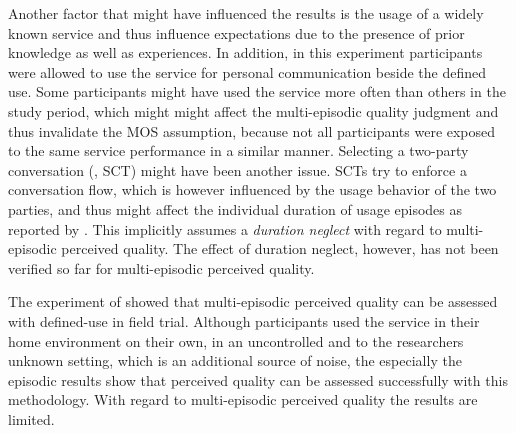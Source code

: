 Another factor that might have influenced the results is the usage of a widely known service and thus influence expectations due to the presence of prior knowledge as well as experiences.
In addition, in this experiment participants were allowed to use the service for personal communication beside the defined use.
Some participants might have used the service more often than others in the study period, which might might affect the multi-episodic quality judgment and thus invalidate the \ac{MOS} assumption, because not all participants were exposed to the same service performance in a similar manner.
Selecting a two-party conversation (\ie, \ac{SCT}) might have been another issue.
\acp{SCT} try to enforce a conversation flow, which is however influenced by the usage behavior of the two parties, and thus might affect the individual duration of usage episodes as reported by \cite{moller_single-call_2011}.
This implicitly assumes a \emph{duration neglect} with regard to multi-episodic perceived quality.
The effect of duration neglect, however, has not been verified so far for multi-episodic perceived quality.

The experiment of \cite{moller_single-call_2011} showed that multi-episodic perceived quality can be assessed with defined-use in field trial.
Although participants used the service in their home environment on their own, \ie in an uncontrolled and to the researchers unknown setting, which is an additional source of noise, the especially the episodic results show that perceived quality can be assessed successfully with this methodology.
With regard to multi-episodic perceived quality the results are limited.

